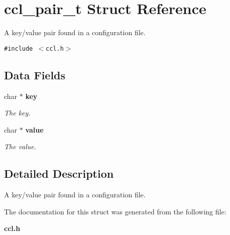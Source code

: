 \section{ccl\_\-pair\_\-t Struct Reference}
\label{structccl__pair__t}
A key/value pair found in a configuration file.  


{\tt \#include $<$ccl.h$>$}

\subsection*{Data Fields}
\begin{CompactItemize}
\item 
char $\ast$ {\bf key}\label{structccl__pair__t_o0}

\begin{CompactList}\small\item\em The key. \item\end{CompactList}\item 
char $\ast$ {\bf value}\label{structccl__pair__t_o1}

\begin{CompactList}\small\item\em The value. \item\end{CompactList}\end{CompactItemize}


\subsection{Detailed Description}
A key/value pair found in a configuration file. 



The documentation for this struct was generated from the following file:\begin{CompactItemize}
\item 
{\bf ccl.h}\end{CompactItemize}
